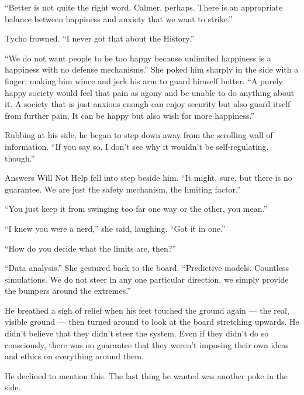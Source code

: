 ``Better is not quite the right word. Calmer, perhaps. There is an appropriate balance between happiness and anxiety that we want to strike.''

Tycho frowned. ``I never got that about the History.''

``We do not want people to be too happy because unlimited happiness is a happiness with no defense mechanisms.'' She poked him sharply in the side with a finger, making him wince and jerk his arm to guard himself better. ``A purely happy society would feel that pain as agony and be unable to do anything about it. A society that is just anxious enough can enjoy security but also guard itself from further pain. It can be happy but also wish for more happiness.''

Rubbing at his side, he began to step down away from the scrolling wall of information. ``If you say so. I don't see why it wouldn't be self-regulating, though.''

Answers Will Not Help fell into step beside him. ``It might, sure, but there is no guarantee. We are just the safety mechanism, the limiting factor.''

``You just keep it from swinging too far one way or the other, you mean.''

``I knew you were a nerd,'' she said, laughing. ``Got it in one.''

``How do you decide what the limits are, then?''

``Data analysis.'' She gestured back to the board. ``Predictive models. Countless simulations. We do not steer in any one particular direction, we simply provide the bumpers around the extremes.''

He breathed a sigh of relief when his feet touched the ground again — the real, visible ground — then turned around to look at the board stretching upwards. He didn't believe that they didn't steer the system. Even if they didn't do so consciously, there was no guarantee that they weren't imposing their own ideas and ethics on everything around them.

He declined to mention this. The last thing he wanted was another poke in the side.
